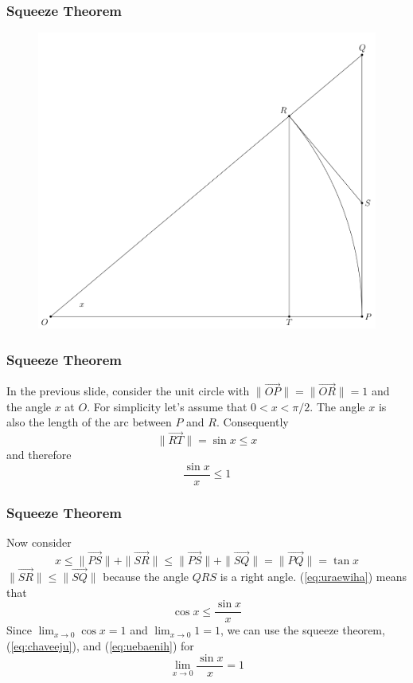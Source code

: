 \documentclass[xcolor=dvipsnames]{beamer}
\begin{document}
\begin{frame}
  \frametitle{Squeeze Theorem}
\begin{figure}[h]
\includegraphics[scale=.24]{./limsinxoverx.png}
\end{figure}
\end{frame}

\begin{frame}
  \frametitle{Squeeze Theorem}
  In the previous slide, consider the unit circle with
  $\|\vec{OP}\|=\|\vec{OR}\|=1$ and the angle $x$ at $O$. For simplicity let's
  assume that $0<x<\pi/2$. The angle $x$ is also the length of the arc
  between $P$ and $R$. Consequently
  \begin{equation}
    \label{eq:iufoobue}
\|\vec{RT}\|=\sin{}x\leq{}x    
  \end{equation}
  and therefore
  \begin{equation}
    \label{eq:chaveeju}
    \frac{\sin{}x}{x}\leq{}1
  \end{equation}
\end{frame}

\begin{frame}
  \frametitle{Squeeze Theorem}
  Now consider
  \begin{equation}
    \label{eq:uraewiha}
    x\leq\|\vec{PS}\|+\|\vec{SR}\|\leq\|\vec{PS}\|+\|\vec{SQ}\|=\|\vec{PQ}\|=\tan{}x
  \end{equation}
$\|\vec{SR}\|\leq\|\vec{SQ}\|$ because the angle $QRS$ is a right angle.
(\ref{eq:uraewiha}) means that
\begin{equation}
  \label{eq:uebaenih}
  \cos{}x\leq\frac{\sin{}x}{x}
\end{equation}
Since $\lim_{x\rightarrow{}0}\cos{}x=1$ and $\lim_{x\rightarrow{}0}1=1$, we can use the squeeze
theorem, (\ref{eq:chaveeju}), and (\ref{eq:uebaenih}) for
\begin{equation}
  \label{eq:guabighe}
  \lim_{x\rightarrow{}0}\frac{\sin{}x}{x}=1
\end{equation}
\end{frame}
\end{document}
